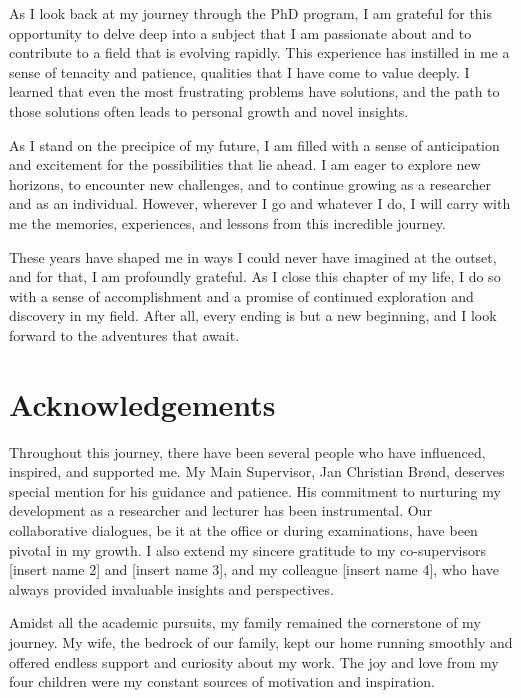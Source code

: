 \documentclass[
  10pt,
  letterpaper,
  DIV=11,
  numbers=noendperiod]{scrartcl}
\begin{document}
As I look back at my journey through the PhD program, I am grateful for
this opportunity to delve deep into a subject that I am passionate about
and to contribute to a field that is evolving rapidly. This experience
has instilled in me a sense of tenacity and patience, qualities that I
have come to value deeply. I learned that even the most frustrating
problems have solutions, and the path to those solutions often leads to
personal growth and novel insights.

As I stand on the precipice of my future, I am filled with a sense of
anticipation and excitement for the possibilities that lie ahead. I am
eager to explore new horizons, to encounter new challenges, and to
continue growing as a researcher and as an individual. However, wherever
I go and whatever I do, I will carry with me the memories, experiences,
and lessons from this incredible journey.

These years have shaped me in ways I could never have imagined at the
outset, and for that, I am profoundly grateful. As I close this chapter
of my life, I do so with a sense of accomplishment and a promise of
continued exploration and discovery in my field. After all, every ending
is but a new beginning, and I look forward to the adventures that await.

\newpage

\hypertarget{acknowledgements}{%
\section{Acknowledgements}\label{acknowledgements}}

Throughout this journey, there have been several people who have
influenced, inspired, and supported me. My Main Supervisor, Jan
Christian Brønd, deserves special mention for his guidance and patience.
His commitment to nurturing my development as a researcher and lecturer
has been instrumental. Our collaborative dialogues, be it at the office
or during examinations, have been pivotal in my growth. I also extend my
sincere gratitude to my co-supervisors {[}insert name 2{]} and {[}insert
name 3{]}, and my colleague {[}insert name 4{]}, who have always
provided invaluable insights and perspectives.

Amidst all the academic pursuits, my family remained the cornerstone of
my journey. My wife, the bedrock of our family, kept our home running
smoothly and offered endless support and curiosity about my work. The
joy and love from my four children were my constant sources of
motivation and inspiration.
\end{document}
